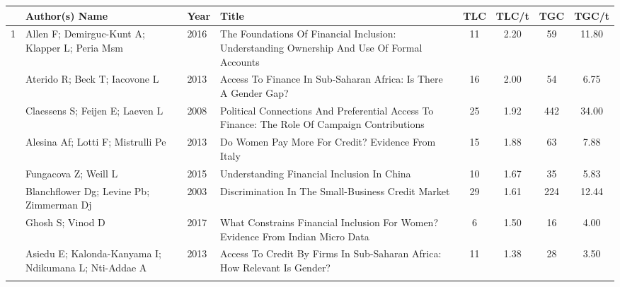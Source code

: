 

%





\begin{table}[ht]
	\centering
	\footnotesize
	\setlength{\tabcolsep}{4pt}
	\begin{tabularx}{\textwidth}{l 
			>{\raggedright\arraybackslash}p{2.5cm} 
			l 
			>{\raggedright\arraybackslash}X 
			S[table-format=2] 
			S[table-format=1.2]
			S[table-format=3]
			S[table-format=2.2] } 
		\toprule
		& Author(s) Name & Year &  Title & {TLC} & {TLC/t} & {TGC} & {TGC/t} \\ 
		 & Allen F; Demirguc-Kunt A; Klapper L; Peria Msm & 2016 & The Foundations Of Financial Inclusion: Understanding Ownership And Use Of Formal Accounts &  11 & 2.20 &  59 & 11.80 \\   & Aterido R; Beck T; Iacovone L & 2013 & Access To Finance In Sub-Saharan Africa: Is There A Gender Gap? &  16 & 2.00 &  54 & 6.75 \\  & Claessens S; Feijen E; Laeven L & 2008 & Political Connections And Preferential Access To Finance: The Role Of Campaign Contributions &  25 & 1.92 & 442 & 34.00 \\  & Alesina Af; Lotti F; Mistrulli Pe & 2013 & Do Women Pay More For Credit? Evidence From Italy &  15 & 1.88 &  63 & 7.88 \\  & Fungacova Z; Weill L & 2015 & Understanding Financial Inclusion In China &  10 & 1.67 &  35 & 5.83 \\  & Blanchflower Dg; Levine Pb; Zimmerman Dj & 2003 & Discrimination In The Small-Business Credit Market &  29 & 1.61 & 224 & 12.44 \\  & Ghosh S; Vinod D & 2017 & What Constrains Financial Inclusion For Women? Evidence From Indian Micro Data &   6 & 1.50 &  16 & 4.00 \\  & Asiedu E; Kalonda-Kanyama I; Ndikumana L; Nti-Addae A & 2013 & Access To Credit By Firms In Sub-Saharan Africa: How Relevant Is Gender? &  11 & 1.38 &  28 & 3.50 \\ \addlinespace

\end{tabularx}
\end{table}
